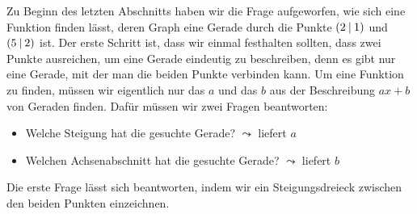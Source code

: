 \documentclass[../../main.tex]{subfiles}
\begin{document}
Zu Beginn des letzten Abschnitts haben wir die Frage aufgeworfen, wie sich eine Funktion finden lässt, deren Graph eine Gerade durch die Punkte $\left(2 \:\middle|\: 1\right)$ und $\left(5 \:\middle|\: 2\right)$ ist. Der erste Schritt ist, dass wir einmal festhalten sollten, dass zwei Punkte ausreichen, um eine Gerade eindeutig zu beschreiben, denn es gibt nur eine Gerade, mit der man die beiden Punkte verbinden kann. Um eine Funktion zu finden, müssen wir eigentlich nur das $a$ und das $b$ aus der Beschreibung $ax+b$ von Geraden finden. Dafür müssen wir zwei Fragen beantworten:
\begin{itemize}
    \item Welche Steigung hat die gesuchte Gerade? \hfill \textcolor{black!40}{$\leadsto$ liefert $a$}
    \item Welchen Achsenabschnitt hat die gesuchte Gerade? \hfill \textcolor{black!40}{$\leadsto$ liefert $b$}
\end{itemize}

Die erste Frage lässt sich beantworten, indem wir ein Steigungsdreieck zwischen den beiden Punkten einzeichnen.
\end{document}
